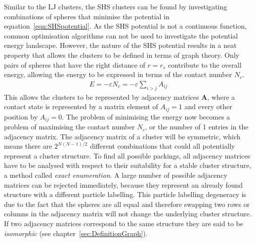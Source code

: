Similar to the \ac{LJ} clusters, the \ac{SHS} clusters can be found by
investigating combinations of spheres that minimise the potential in
equation~\eqref{eqn:SHSpotential}. As the \ac{SHS} potential is not a continuous
function, common optimisation algorithms can not be used to investigate the potential
energy landscape. However, the nature of the \ac{SHS} potential results in a
neat property that allows the clusters to be defined in terms of graph theory.
Only pairs of spheres that have the right distance of $r=r_s$ contribute to the
overall energy, allowing the energy to be expressed in terms of the contact
number $N_c$.
%
\begin{align}
    E=-\varepsilon N_c=-\varepsilon \sum\limits_{i>j} A_{ij}
\end{align}
%
This allows the clusters to be represented by adjacency matrices $\mathbf{A}$,
where a contact state is represented by a matrix element of $A_{ij}=1$
and every other position by
$A_{ij}=0$.\autocite{Arkus_DerivingFiniteSphere_2011} The problem of
minimising the energy now becomes a problem of maximising the contact number
$N_c$, or the number of 1 entries in the adjacency matrix. The adjacency matrix
of a cluster will be symmetric, which means there are $2^{N(N- 1)/2}$ different
combinations that could all potentially represent a cluster structure. To find
all possible packings, all adjacency matrices have to be analysed with respect
to their suitability for a stable cluster structure, a method called
\textit{exact enumeration}. A large number of possible adjacency matrices can be
rejected immediately, because they represent an already found structure with a
different particle labelling. This particle labelling degeneracy is due to the
fact that the spheres are all equal and therefore swapping two rows or columns
in the adjacency matrix will not change the underlying cluster structure. If two
adjacency matrices correspond to the same structure they are said to be
\textit{isomorphic} (see chapter~\ref{sec:DefinitionGraph}).

